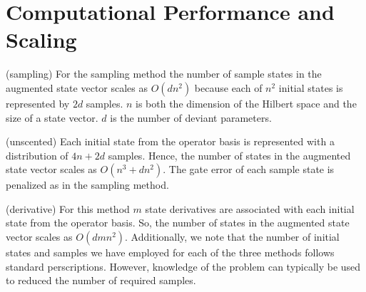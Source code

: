 \section{Computational Performance and Scaling}

(sampling) For the sampling method the number of sample states in the augmented state vector
scales as $O(dn^{2})$
because each of $n^{2}$ initial
states is represented by $2d$ samples. $n$ is both the dimension of the Hilbert space
and the size of a state vector. $d$ is the number of deviant parameters.

(unscented) Each initial state from the operator basis
is represented with a distribution of $4n + 2d$ samples. Hence,
the number of states in the augmented state vector scales as $O(n^{3} + dn^{2})$.
The gate error of each sample state is penalized as in the sampling method.


(derivative) For this method $m$ state derivatives are associated with each
initial state from the operator basis.
So, the number of states in the augmented state vector scales as
$O(dmn^{2})$. Additionally, we note that the number of initial
states and samples we have employed for each of the three
methods follows standard perscriptions. However, knowledge
of the problem can typically be used to reduced the number
of required samples.
